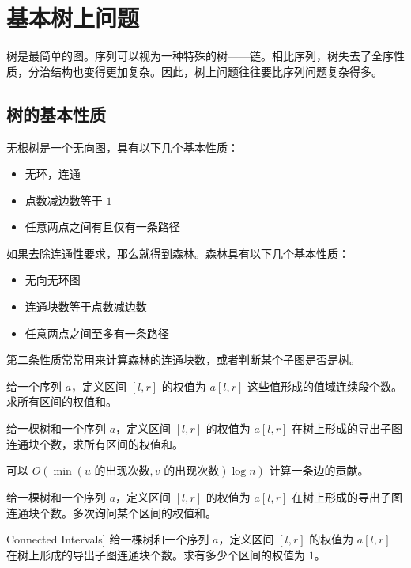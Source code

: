\chapter{基本树上问题}

树是最简单的图。序列可以视为一种特殊的树——链。相比序列，树失去了全序性质，分治结构也变得更加复杂。因此，树上问题往往要比序列问题复杂得多。


\section{树的基本性质}

无根树是一个无向图，具有以下几个基本性质：
\begin{itemize}
    \item 无环，连通
    \item 点数减边数等于 $1$
    \item 任意两点之间有且仅有一条路径
\end{itemize}

如果去除连通性要求，那么就得到森林。森林具有以下几个基本性质：
\begin{itemize}
    \item 无向无环图
    \item 连通块数等于点数减边数
    \item 任意两点之间至多有一条路径
\end{itemize}
    
第二条性质常常用来计算森林的连通块数，或者判断某个子图是否是树。
\begin{example}[ABC390F]
    给一个序列 $a$，定义区间 $[l,r]$ 的权值为 $a[l,r]$ 这些值形成的值域连续段个数。求所有区间的权值和。
\end{example}
\begin{exercise}
    给一棵树和一个序列 $a$，定义区间 $[l,r]$ 的权值为 $a[l,r]$ 在树上形成的导出子图连通块个数，求所有区间的权值和。
    \begin{hint}
        可以 $O(\min(u\text{ 的出现次数}, v\text{ 的出现次数})\log n)$ 计算一条边的贡献。
    \end{hint}
\end{exercise}
\begin{exercise}
    给一棵树和一个序列 $a$，定义区间 $[l,r]$ 的权值为 $a[l,r]$ 在树上形成的导出子图连通块个数。多次询问某个区间的权值和。
\end{exercise}
\begin{exercise}[[SDCPC 2019] Connected Intervals]
    给一棵树和一个序列 $a$，定义区间 $[l,r]$ 的权值为 $a[l,r]$ 在树上形成的导出子图连通块个数。求有多少个区间的权值为 $1$。
\end{exercise}

